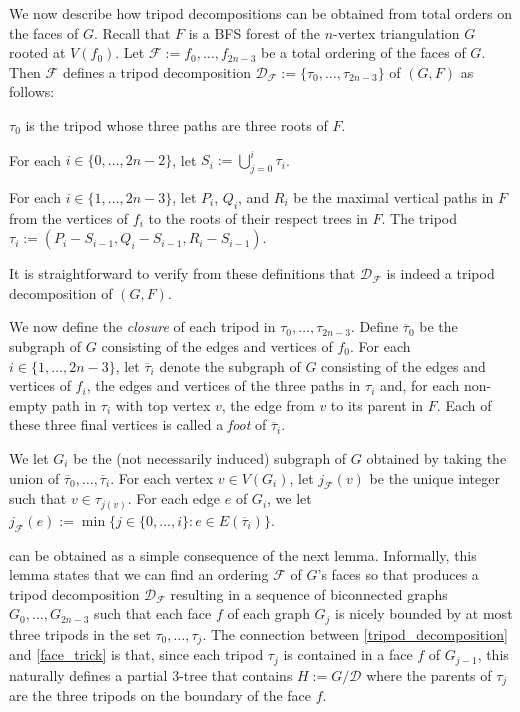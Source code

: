 \documentclass{patmorin}
\begin{document}
We now describe how tripod decompositions can be obtained from total orders on the faces of $G$.  Recall that $F$ is a BFS forest of the $n$-vertex triangulation $G$ rooted at $V(f_0)$.  Let $\mathcal{F}:=f_0,\ldots,f_{2n-3}$ be a total ordering of the faces of $G$.  Then $\mathcal{F}$ defines a tripod decomposition $\mathcal{D}_\mathcal{F}:=\{\tau_0,\ldots,\tau_{2n-3}\}$ of $(G,F)$ as follows:
\begin{compactenum}
  \item $\tau_0$ is the tripod whose three paths are three roots of $F$.
  \item For each $i\in\{0,\ldots,2n-2\}$, let $S_i:=\bigcup_{j=0}^i \tau_i$.
  \item For each $i\in\{1,\ldots,2n-3\}$, let $P_i$, $Q_i$, and $R_i$ be the maximal vertical paths in $F$ from the vertices of $f_i$ to the roots of their respect trees in $F$.  The tripod $\tau_i:=(P_i-S_{i-1},Q_i-S_{i-1},R_i-S_{i-1})$.
\end{compactenum}
It is straightforward to verify from these definitions that $\mathcal{D}_\mathcal{F}$ is indeed a tripod decomposition of $(G,F)$.

We now define the \emph{closure} of each tripod in $\tau_0,\ldots,\tau_{2n-3}$.  Define $\overline{\tau}_0$ be the subgraph of $G$ consisting of the edges and vertices of $f_0$.  For each $i\in\{1,\ldots,2n-3\}$, let $\overline{\tau}_i$ denote the subgraph of $G$ consisting of the edges and vertices of $f_i$, the edges and vertices of the three paths in $\tau_i$ and, for each non-empty path in $\tau_i$ with top vertex $v$, the edge from $v$ to its parent in $F$.  Each of these three final vertices is called a \emph{foot} of $\overline{\tau}_i$.


We let $G_i$ be the (not necessarily induced) subgraph of $G$ obtained by taking the union of $\overline{\tau}_0,\ldots,\overline{\tau}_i$.  For each vertex $v\in V(G_i)$, let $j_\mathcal{F}(v)$ be the unique integer such that $v\in \tau_{j(v)}$. For each edge $e$ of $G_i$, we let $j_\mathcal{F}(e):=\min\{j\in\{0,\ldots,i\}:e\in E(\overline{\tau}_i)\}$.

 can be obtained as a simple consequence of the next lemma. Informally, this lemma states that we can find an ordering $\mathcal{F}$ of $G$'s faces so that produces a tripod decomposition $\mathcal{D}_\mathcal{F}$ resulting in a sequence of biconnected graphs $G_0,\ldots,G_{2n-3}$ such that each face $f$ of each graph $G_j$ is nicely bounded by at most three tripods in the set $\tau_0,\ldots,\tau_j$.  The connection between \cref{tripod_decomposition} and \cref{face_trick} is that, since each tripod $\tau_j$ is contained in a face $f$ of $G_{j-1}$, this naturally defines a partial $3$-tree that contains $H:=G/\mathcal{D}$ where the parents of $\tau_j$ are the three tripods on the boundary of the face $f$.
\end{document}
